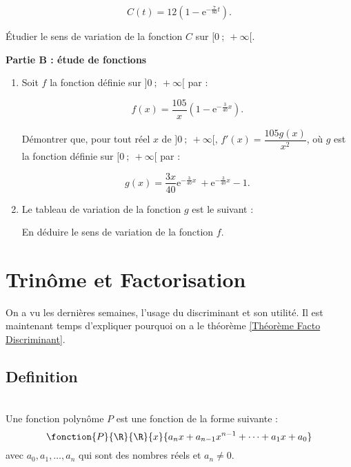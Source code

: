 \documentclass[12pt,fleqn]{report} %
\begin{document}
\begin{exercise}
	\[C(t) =  12\left(1 - \text{e}^{-\frac{7}{80} t}\right).\]
	
	Étudier le sens de variation de la fonction $C$ sur $[0~;~+ \infty[$.
	
	
	\bigskip
	
	\textbf{Partie B : étude de fonctions}
	
	\medskip
	
	\begin{enumerate}
		\item Soit $f$ la fonction définie sur $]0~;~+ \infty[$ par : 
		
		\[f(x) = \dfrac{105}{x} \left(1 - \text{e}^{- \frac{3}{40}x}\right).\]
		
		Démontrer que, pour tout réel $x$ de  $]0~;~+ \infty[$, \:  $f'(x) = \dfrac{105g(x)}{x^2}$, où $g$ est la fonction définie sur $[0~;~+ \infty[$ par : 
		
		\[g(x) = \dfrac{3x}{40}\text{e}^{- \frac{3}{40}x}\ + \text{e}^{- \frac{3}{40}x} - 1.\]
		
		\item  Le tableau de variation de la fonction $g$ est le suivant :
		\begin{center}
		\end{center}
		
		En déduire le sens de variation de la fonction $f$.
		
	\end{enumerate}	
	
\end{exercise}


\setcounter{chapter}{3}
\chapter{Trinôme et Factorisation}
On a vu les dernières semaines, l'usage du discriminant et son utilité. Il est maintenant temps d'expliquer pourquoi on a le théorème \ref{Théorème Facto Discriminant}.

\section{Definition}
\begin{definition}\text{ }\\
	Une fonction polynôme $P$ est une fonction de la forme suivante : 
	\[
	\fonction{P}{\R}{\R}{x}{a_n x + a_{n-1} x^{n-1} + \dots + a_1 x + a_0}
	\]
	avec $a_0,a_1,\dots,a_n$ qui sont des nombres réels et $a_n \neq 0$.
\end{definition}
\end{document}
